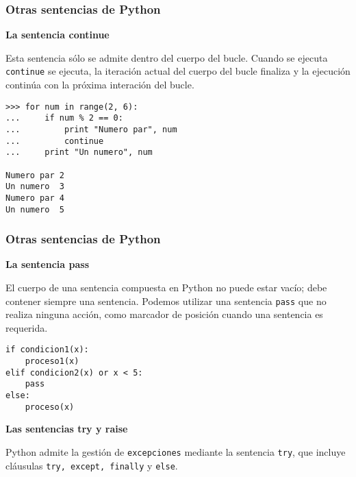\documentclass[10pt]{beamer}
\begin{document}
\begin{frame}[fragile]
\frametitle{Otras sentencias de Python}

\textbf{La sentencia continue}

\vspace{0.2cm}

Esta sentencia s\'olo se admite dentro del cuerpo del bucle. Cuando se ejecuta \texttt{continue} se ejecuta, la iteraci\'on actual del cuerpo del bucle finaliza y la ejecuci\'on contin\'ua con la pr\'oxima interaci\'on del bucle. 

\vspace{0.2cm}

\begin{lstlisting}
>>> for num in range(2, 6):
...     if num % 2 == 0:
...         print "Numero par", num
...         continue
...     print "Un numero", num

Numero par 2
Un numero  3
Numero par 4
Un numero  5
\end{lstlisting}
\end{frame}


\begin{frame}[fragile]
\frametitle{Otras sentencias de Python}

\textbf{La sentencia pass}

\vspace{0.2cm}

El cuerpo de una sentencia compuesta en Python no puede estar vac\'io; debe contener siempre una sentencia. Podemos utilizar una sentencia \texttt{pass} que no realiza ninguna acci\'on, como marcador de posici\'on cuando una sentencia es requerida.

\vspace{0.2cm}

\begin{lstlisting}
if condicion1(x):
    proceso1(x)
elif condicion2(x) or x < 5:
    pass
else:
    proceso(x)
\end{lstlisting}

\vspace{0.2cm}

\textbf{Las sentencias try y raise}

\vspace{0.2cm}

Python admite la gesti\'on de \texttt{excepciones} mediante la sentencia \texttt{try}, que incluye cl\'ausulas \texttt{try, except, finally} y \texttt{else}. 

\end{frame}
\end{document}
